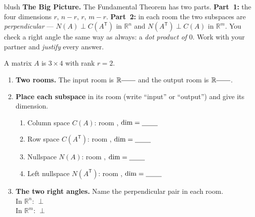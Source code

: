\documentclass[10pt]{article}
\newcommand{\T}{\mathsf{T}}
\begin{document}
\namepartnerperiod

\vspace{0.10in}

\begin{headlinebox}{blush}
\small\textbf{The Big Picture.} The Fundamental Theorem has two parts. \textbf{Part~1:} the four dimensions
$r,\,n-r,\,r,\,m-r$. \textbf{Part~2:} in each room the two subspaces are \emph{perpendicular} --- $N(A)\perp
C(A^{\T})$ in $\mathbb{R}^n$ and $N(A^{\T})\perp C(A)$ in $\mathbb{R}^m$. You check a right angle the same way
as always: a \emph{dot product of $0$}. Work with your partner and \emph{justify} every answer.
\end{headlinebox}

\vspace{0.08in}

\begin{tcolorbox}[colback=white, colframe=black!40, title=\textbf{Tier R --- Remediate},
    fonttitle=\bfseries, arc=1.5mm, left=3mm, right=3mm, top=2mm, bottom=2mm, breakable]
A matrix $A$ is $3\times 4$ with rank $r=2$.
\begin{enumerate}[leftmargin=1.7em, itemsep=8pt]
  \item \textbf{Two rooms.} The input room is $\mathbb{R}^{\blank{0.7cm}}$ and the output room is
        $\mathbb{R}^{\blank{0.7cm}}$.
  \item \textbf{Place each subspace} in its room (write ``input'' or ``output'') and give its dimension.
    \begin{enumerate}[label=(\alph*), leftmargin=1.8em, itemsep=4pt]
      \item Column space $C(A)$: room \blank{1.6cm}, $\dim=\blank{0.8cm}$
      \item Row space $C(A^{\T})$: room \blank{1.6cm}, $\dim=\blank{0.8cm}$
      \item Nullspace $N(A)$: room \blank{1.6cm}, $\dim=\blank{0.8cm}$
      \item Left nullspace $N(A^{\T})$: room \blank{1.6cm}, $\dim=\blank{0.8cm}$
    \end{enumerate}
  \item \textbf{The two right angles.} Name the perpendicular pair in each room.
        \\ In $\mathbb{R}^n$: \blank{3.2cm} $\perp$ \blank{3.2cm}
        \\ In $\mathbb{R}^m$: \blank{3.2cm} $\perp$ \blank{3.2cm}
\end{enumerate}
\end{tcolorbox}
\end{document}

